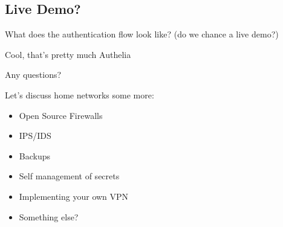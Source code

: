 \documentclass{beamer}
\begin{document}
\subsection{Live Demo?}

\begin{frame}
    \begin{center}
        What does the authentication flow look like? (do we chance a live demo?)
    \end{center}
\end{frame}

\begin{frame}
    \begin{center}
        Cool, that's pretty much Authelia
        \vspace{5mm}\par\noindent
        Any questions?
    \end{center}
\end{frame}

\begin{frame}
    \begin{center}
        Let's discuss home networks some more:
    \end{center}
    \begin{itemize}
        \item Open Source Firewalls
        \item IPS/IDS
        \item Backups
        \item Self management of secrets
        \item Implementing your own VPN
        \item Something else?
    \end{itemize}
\end{frame}
\end{document}
